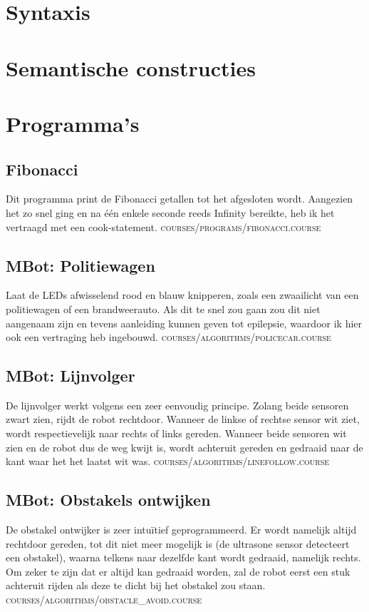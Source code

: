 \documentclass[12pt,a4paper]{report}
\begin{document}
\chapter{Syntaxis}

\chapter{Semantische constructies}

\chapter{Programma's}

\section{Fibonacci}
Dit programma print de Fibonacci getallen tot het afgesloten wordt. Aangezien het zo snel ging en na één enkele seconde reeds Infinity bereikte, heb ik het vertraagd met een cook-statement. \textsc{courses/programs/fibonacci.course}
\section{MBot: Politiewagen}
Laat de LEDs afwisselend rood en blauw knipperen, zoals een zwaailicht van een politiewagen of een brandweerauto. Als dit te snel zou gaan zou dit niet aangenaam zijn en tevens aanleiding kunnen geven tot epilepsie, waardoor ik hier ook een vertraging heb ingebouwd. \textsc{courses/algorithms/policecar.course}
\section{MBot: Lijnvolger}
De lijnvolger werkt volgens een zeer eenvoudig principe. Zolang beide sensoren zwart zien, rijdt de robot rechtdoor. Wanneer de linkse of rechtse sensor wit ziet, wordt respectievelijk naar rechts of links gereden. Wanneer beide sensoren wit zien en de robot dus de weg kwijt is, wordt achteruit gereden en gedraaid naar de kant waar het het laatst wit was. \textsc{courses/algorithms/linefollow.course}
\section{MBot: Obstakels ontwijken}
De obstakel ontwijker is zeer intuïtief geprogrammeerd. Er wordt namelijk altijd rechtdoor gereden, tot dit niet meer mogelijk is (de ultrasone sensor detecteert een obstakel), waarna telkens naar dezelfde kant wordt gedraaid, namelijk rechts. Om zeker te zijn dat er altijd kan gedraaid worden, zal de robot eerst een stuk achteruit rijden als deze te dicht bij het obstakel zou staan. \textsc{courses/algorithms/obstacle\_avoid.course}
\end{document}
